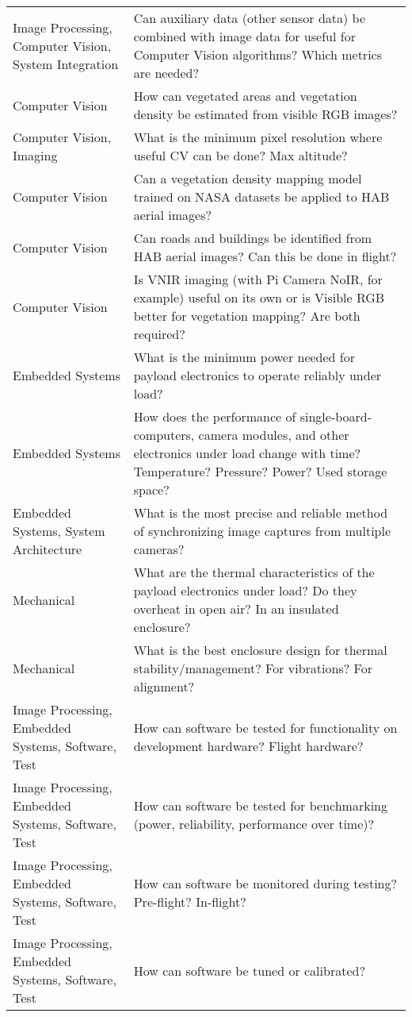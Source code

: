 \documentclass[conference]{IEEEtran} %
\begin{document}
\begin{table}
\begin{tabularx}{\linewidth}{@{}p{}X@{}}
    Image Processing, Computer Vision, System Integration & Can auxiliary data (other sensor data) be combined with image data for useful for Computer Vision algorithms? Which metrics are needed? \\
    Computer Vision & How can vegetated areas and vegetation density be estimated from visible RGB images? \\
    Computer Vision, Imaging & What is the minimum pixel resolution where useful CV can be done? Max altitude? \\
    Computer Vision & Can a vegetation density mapping model trained on NASA datasets be applied to HAB aerial images? \\
    Computer Vision & Can roads and buildings be identified from HAB aerial images? Can this be done in flight? \\
    Computer Vision & Is VNIR imaging (with Pi Camera NoIR, for example) useful on its own or is Visible RGB better for vegetation mapping? Are both required? \\
    Embedded Systems & What is the minimum power needed for payload electronics to operate reliably under load? \\
    Embedded Systems & How does the performance of single-board-computers, camera modules, and other electronics under load change with time? Temperature? Pressure? Power? Used storage space? \\
    Embedded Systems, System Architecture & What is the most precise and reliable method of synchronizing image captures from multiple cameras? \\
    Mechanical & What are the thermal characteristics of the payload electronics under load? Do they overheat in open air? In an insulated enclosure? \\
    Mechanical & What is the best enclosure design for thermal stability/management? For vibrations? For alignment? \\
    Image Processing, Embedded Systems, Software, Test & How can software be tested for functionality on development hardware? Flight hardware? \\
    Image Processing, Embedded Systems, Software, Test & How can software be tested for benchmarking (power, reliability, performance over time)? \\
    Image Processing, Embedded Systems, Software, Test & How can software be monitored during testing? Pre-flight? In-flight? \\
    Image Processing, Embedded Systems, Software, Test & How can software be tuned or calibrated? \\
\end{tabularx}
\end{table}
\end{document}
